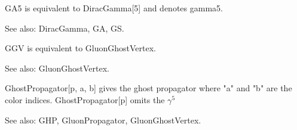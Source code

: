 

GA5 is equivalent to DiracGamma[5] and denotes gamma5.

See also:  DiracGamma, GA, GS.








GGV is equivalent to GluonGhostVertex.

See also:  GluonGhostVertex.



GhostPropagator[p, a, b] gives the ghost propagator where "a" and "b" are the color indices. GhostPropagator[p] omits the \({{\gamma }^5}\)

See also:  GHP, GluonPropagator, GluonGhostVertex.














